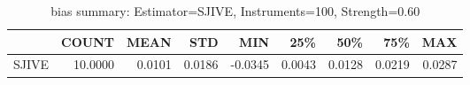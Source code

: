 \begin{table}[ht]
\centering
\caption{bias summary: Estimator=SJIVE, Instruments=100, Strength=0.60}
\begin{tabular}{lrrrrrrrr}
\toprule
 & COUNT & MEAN & STD & MIN & 25\% & 50\% & 75\% & MAX \\
\midrule
SJIVE & 10.0000 & 0.0101 & 0.0186 & -0.0345 & 0.0043 & 0.0128 & 0.0219 & 0.0287 \\
\bottomrule
\end{tabular}
\end{table}
